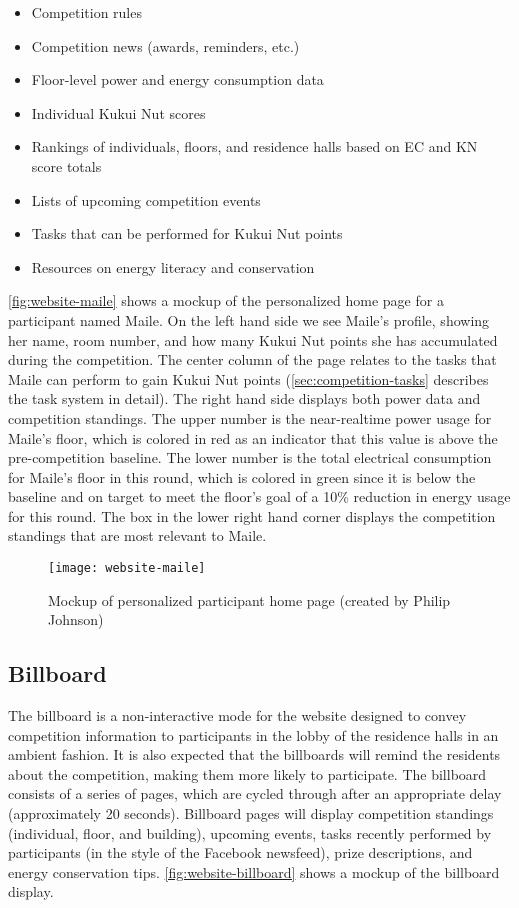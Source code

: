 \begin{itemize}
	\item Competition rules
	\item Competition news (awards, reminders, etc.)
	\item Floor-level power and energy consumption data
	\item Individual Kukui Nut scores
	\item Rankings of individuals, floors, and residence halls based on EC and KN score totals
	\item Lists of upcoming competition events
	\item Tasks that can be performed for Kukui Nut points
	\item Resources on energy literacy and conservation
\end{itemize}

\autoref{fig:website-maile} shows a mockup of the personalized home page for a participant named Maile. On the left hand side we see Maile's profile, showing her name, room number, and how many Kukui Nut points she has accumulated during the competition. The center column of the page relates to the tasks that Maile can perform to gain Kukui Nut points (\autoref{sec:competition-tasks} describes the task system in detail). The right hand side displays both power data and competition standings. The upper number is the near-realtime power usage for Maile's floor, which is colored in red as an indicator that this value is above the pre-competition baseline. The lower number is the total electrical consumption for Maile's floor in this round, which is colored in green since it is below the baseline and on target to meet the floor's goal of a 10\% reduction in energy usage for this round. The box in the lower right hand corner displays the competition standings that are most relevant to Maile.

\begin{figure}[htb]
	\centering
		\texttt{[image: website-maile]}
		\caption{Mockup of personalized participant home page (created by Philip Johnson)}
		\label{fig:website-maile}
\end{figure}

\subsection{Billboard}
\label{sec:billboard-design}

The billboard is a non-interactive mode for the website designed to convey competition information to participants in the lobby of the residence halls in an ambient fashion. It is also expected that the billboards will remind the residents about the competition, making them more likely to participate. The billboard consists of a series of pages, which are cycled through after an appropriate delay (approximately 20 seconds). Billboard pages will display competition standings (individual, floor, and building), upcoming events, tasks recently performed by participants (in the style of the Facebook newsfeed), prize descriptions, and energy conservation tips. \autoref{fig:website-billboard} shows a mockup of the billboard display.

